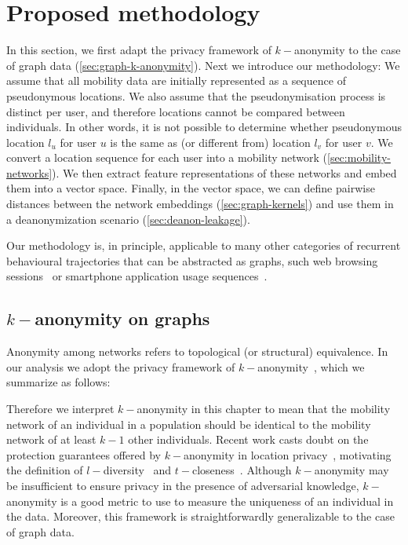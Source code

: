\section{Proposed methodology\label{sec:methodology}}

 In this section, we first adapt the privacy framework of $k-$anonymity to the case of graph data (\cref{sec:graph-k-anonymity}). Next we introduce our methodology: We assume that all mobility data are initially represented as a sequence of pseudonymous locations.
We also assume that the pseudonymisation process is distinct per user, and therefore locations cannot be compared between individuals.
In other words, it is not possible to determine whether pseudonymous location $l_u$ for user $u$ is the same as (or different from) location $l_v$ for user $v$.
We convert a location sequence for each user into a mobility network (\cref{sec:mobility-networks}). 
We then extract feature representations of these networks and embed them into a vector space.
Finally, in the vector space, we can define pairwise distances between the network embeddings (\cref{sec:graph-kernels}) and use them in a deanonymization scenario (\cref{sec:deanon-leakage}).  

Our methodology is, in principle, applicable to many other categories of recurrent behavioural trajectories that can be abstracted as graphs, such web browsing sessions~\citep{olejnik14, yen12} or smartphone application usage sequences~\citep{Welke2016}.

\subsection{$k-$anonymity on graphs\label{sec:graph-k-anonymity}}

Anonymity among networks refers to topological (or structural) equivalence. In our analysis we adopt the privacy framework of $k-$anonymity~\citep{sweeney2002k}, which we summarize as follows:


\vspace{.4cm}
Therefore we interpret $k-$anonymity in this chapter to mean that the mobility network of an individual in a population should be identical to the mobility network of at least $k-1$ other individuals.
Recent work casts doubt on the protection guarantees offered by \mbox{$k-$anonymity} in location privacy~\citep{shokri2010}, motivating the definition of $l-$diversity~\citep{Machanavajjhala2007} and $t-$closeness~\citep{li2007}.
Although $k-$anonymity may be insufficient to ensure privacy in the presence of adversarial knowledge, \mbox{$k-$anonymity} is a good metric to use to measure the uniqueness of an individual in the data.
Moreover, this framework is straightforwardly generalizable to the case of graph data.

